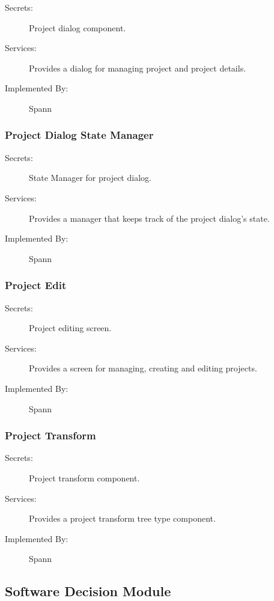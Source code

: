 \documentclass[12pt, titlepage]{article}
\begin{document}
\begin{description}
\item[Secrets:] Project dialog component.
\item[Services:] Provides a dialog for managing project and project details.
\item[Implemented By:] Spann
\end{description}

\subsubsection{Project Dialog State Manager} \label{mdProjectDialogStateManager} 

\begin{description}
\item[Secrets:] State Manager for project dialog.
\item[Services:] Provides a manager that keeps track of the project dialog's state.
\item[Implemented By:] Spann
\end{description}

\subsubsection{Project Edit} \label{mdProjectEdit} 

\begin{description}
\item[Secrets:] Project editing screen.
\item[Services:] Provides a screen for managing, creating and editing projects.
\item[Implemented By:] Spann
\end{description}

\subsubsection{Project Transform} \label{mdProjectTransform} 

\begin{description}
\item[Secrets:] Project transform component.
\item[Services:] Provides a project transform tree type component.
\item[Implemented By:] Spann
\end{description}

\subsection{Software Decision Module}
\end{document}
